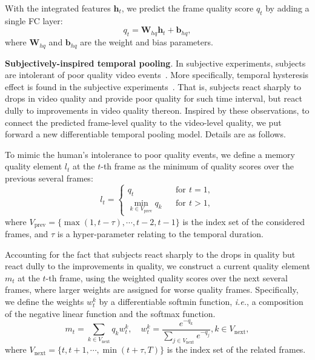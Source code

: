 \documentclass[twocolumn]{svjour3}          \smartqed  \usepackage{graphicx}
\begin{document}
With the integrated features $\mathbf{h}_t$, we predict the frame quality score $q_t$ by adding a single FC layer:
\begin{equation}
q_t = \mathbf{W}_{hq}\mathbf{h}_t+\mathbf{b}_{hq},
\end{equation}
where $\mathbf{W}_{hq}$ and $\mathbf{b}_{hq}$ are the weight and bias parameters.

\textbf{Subjectively-inspired temporal pooling}.
In subjective experiments, subjects are intolerant of poor quality video events~\citep{park2013video}. 
More specifically, temporal hysteresis effect is found in the subjective experiments~\citep{seshadrinathan2011temporal}.
That is, subjects react sharply to drops in video quality and provide poor quality for such time interval, but react dully to improvements in video quality thereon. 
Inspired by these observations, to connect the predicted frame-level quality to the video-level quality, we put forward a new differentiable temporal pooling model. Details are as follows.

To mimic the human's intolerance to poor quality events, we define a memory quality element $l_t$ at the $t$-th frame as the minimum of quality scores over the previous several frames:
\begin{equation}\label{eq:memory score}
l_t =\left\{
\begin{array}{rcl}
q_t & &\mbox{for}\, \ t=1, \\
\min_{k\in V_{\mathrm{prev}}}{q_{k}}  & & \mbox{for}\, \ t>1, 
\end{array} \right.
\end{equation}
where $V_{\mathrm{prev}}=\{\max{(1,t-\tau)},\cdots, t-2, t-1\}$ is the index set of the considered frames, and $\tau$ is a hyper-parameter relating to the temporal duration.

Accounting for the fact that subjects react sharply to the drops in quality but react dully to the improvements in quality, we construct a current quality element $m_t$ at the $t$-th frame, using the weighted quality scores over the next several frames, where larger weights are assigned for worse quality frames. 
Specifically, we define the weights $w_t^k$ by a differentiable softmin function, \textit{i.e.}, a composition of the negative linear function and the softmax function.
\begin{equation}\label{eq:current score}
m_t  = \sum_{k\in V_{\mathrm{next}}}q_{k}w_t^{k},\quad
w_t^k  = \frac{e^{-q_k}}{\sum_{j\in V_{\mathrm{next}}}e^{-q_j}}, k\in V_{\mathrm{next}}, 
\end{equation}
where $V_{\mathrm{next}}=\{t,t+1,\cdots, \min{(t+\tau,T)}\}$ is the index set of the related frames.
\end{document}
